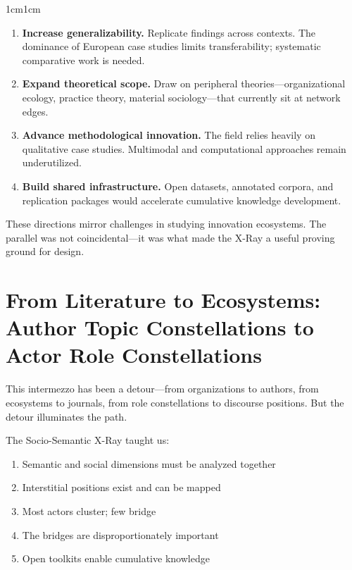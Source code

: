 \documentclass[../main.tex]{subfiles}
\begin{document}
\begin{adjustwidth}{1cm}{1cm}
\begin{enumerate}[leftmargin=2em, itemsep=0.2em]
    \item \textbf{Increase generalizability.} Replicate findings across contexts. The dominance of European case studies limits transferability; systematic comparative work is needed.

    \item \textbf{Expand theoretical scope.} Draw on peripheral theories---organizational ecology, practice theory, material sociology---that currently sit at network edges.

    \item \textbf{Advance methodological innovation.} The field relies heavily on qualitative case studies. Multimodal and computational approaches remain underutilized.

    \item \textbf{Build shared infrastructure.} Open datasets, annotated corpora, and replication packages would accelerate cumulative knowledge development.
\end{enumerate}

These directions mirror challenges in studying innovation ecosystems. The parallel was not coincidental---it was what made the X-Ray a useful proving ground for \RoleBox design.

\vspace{0.8cm}

\section*{From Literature to Ecosystems: Author Topic Constellations to Actor Role Constellations}

This intermezzo has been a detour---from organizations to authors, from ecosystems to journals, from role constellations to discourse positions. But the detour illuminates the path.


The Socio-Semantic X-Ray taught us:
\begin{enumerate}[leftmargin=2em]
    \item Semantic and social dimensions must be analyzed together
    \item Interstitial positions exist and can be mapped
    \item Most actors cluster; few bridge
    \item The bridges are disproportionately important
    \item Open toolkits enable cumulative knowledge
\end{enumerate}


\end{adjustwidth}
\end{document}
